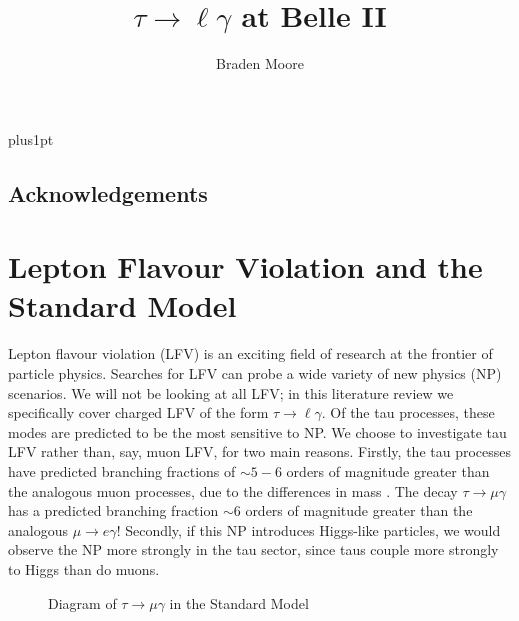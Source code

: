 \documentclass[12pt]{thesis}  %
\title{$\tau\to\ell\gamma$ at Belle II }   %
\author{Braden Moore}             %
\newcommand{\tmg}{\tau\to\mu\gamma}
\newcommand{\tlg}{\tau\to\ell\gamma}
\begin{document}
\baselineskip=18pt plus1pt

\setcounter{secnumdepth}{3}
\setcounter{tocdepth}{3}

\pagestyle{empty}
\maketitle                  %


\pagestyle{plain}
\begin{romanpages}
\tableofcontents

\chapter*{Acknowledgements}



\end{romanpages}


\chapter{Lepton Flavour Violation and the Standard Model}

Lepton flavour violation (LFV) is an exciting field of research at the frontier of particle physics. Searches for LFV can probe a wide variety of new physics (NP) scenarios. We will not be looking at all LFV; in this literature review we specifically cover charged LFV of the form $\tlg$. Of the tau processes, these modes are predicted to be the most sensitive to NP. We choose to investigate tau LFV rather than, say, muon LFV, for two main reasons. Firstly, the tau processes have predicted branching fractions of $\sim 5 - 6$ orders of magnitude greater than the analogous muon processes, due to the differences in mass \cite{Paradisi:2016}. The decay $\tmg$ has a predicted branching fraction $\sim 6$ orders of magnitude greater than the analogous $\mu\to e \gamma$! Secondly, if this NP introduces Higgs-like particles, we would observe the NP more strongly in the tau sector, since taus couple more strongly to Higgs than do muons.

\begin{figure}[h]
\centering
\caption{Diagram of $\tmg$ in the Standard Model}
\label{}
\end{figure}
\end{document}
